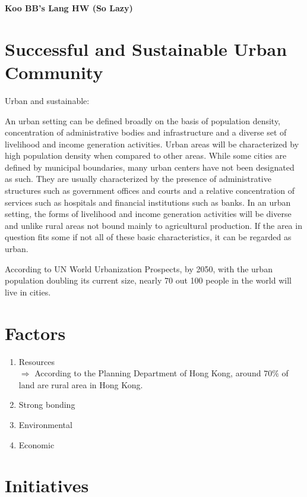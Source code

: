 \documentclass[11pt]{article}
\begin{document}
\begin{center}
    \vspace{0.6cm}
    {\Large \bf Koo BB's Lang HW (So Lazy)}
    \vspace{0.3cm}
\end{center}


\section{Successful and Sustainable Urban Community}
Urban and sustainable:

An urban setting can be defined broadly on the basis of population density, concentration of administrative bodies and infrastructure and a diverse set of livelihood and income generation activities. Urban areas will be characterized by high population density when compared to other areas. While some cities are defined by municipal boundaries, many urban centers have not been designated as such. They are usually characterized by the presence of administrative structures such as government offices and courts and a relative concentration of services such as hospitals and financial institutions such as banks. In an urban setting, the forms of livelihood and income generation activities will be diverse and unlike rural areas not bound mainly to agricultural production. If the area in question fits some if not all of these basic characteristics, it can be regarded as urban.

According to UN World Urbanization Prospects, by 2050, with the urban population doubling its current size, nearly 70 out 100 people in the world will live in cities.



\section{Factors}
\begin{enumerate}
    \item Resources\\
    $\Longrightarrow$ According to the Planning Department of Hong Kong, around $70\%$ of land are rural area in Hong Kong.
    \item Strong bonding 

    \item Environmental

    \item Economic 
\end{enumerate}


\section{Initiatives}
\end{document}
